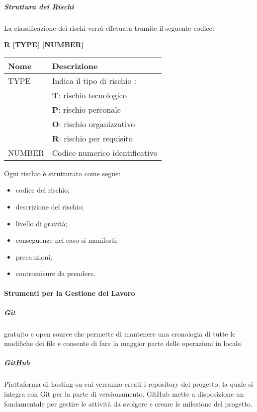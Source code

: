 \subparagraph*{Struttura dei Rischi} \hfill \break
La classificazione dei rischi verrà effetuata tramite il seguente codice:
\begin{center}
    \textbf{R [TYPE] [NUMBER]}
\end{center}
\begin{center}
    \renewcommand{\arraystretch}{1.8} %
    \begin{tabular}{ |m{7em}|m{30em}| }
        \hline
        \textbf{Nome} & \textbf{Descrizione} \\
        \hline
        TYPE & Indica il tipo di rischio :\\
             & \textbf{T}: rischio tecnologico\\
             & \textbf{P}: rischio personale\\
             & \textbf{O}: rischio organizzativo\\
             & \textbf{R}: rischio per requisito\\
        \hline
        NUMBER & Codice numerico identificativo\\
        \hline
    \end{tabular}
\end{center}
Ogni rischio è strutturato come segue:
\begin{itemize}
    \item codice del rischio;
    \item descrizione del rischio;
    \item livello di gravità;
    \item conseguenze nel caso si manifesti;
    \item precauzioni;
    \item contromisure da prendere.
\end{itemize}

\paragraph{Strumenti per la Gestione del Lavoro}
\subparagraph*{Git} \hfill \break
{} gratuito e open source che permette di mantenere una cronologia di tutte le 
modifiche dei file e consente di fare la maggior parte delle operazioni in locale.

\subparagraph*{GitHub} \hfill \break
Piattaforma di hosting su cui verranno creati i repository del progetto, la quale si integra con Git per la 
parte di versionamento. GitHub mette a disposizione un  fondamentale per 
gestire le attività da svolgere e creare le milestone del progetto.